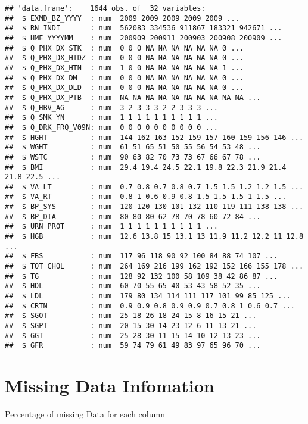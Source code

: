\documentclass{article}
\begin{document}
\begin{verbatim}
## 'data.frame':    1644 obs. of  32 variables:
##  $ EXMD_BZ_YYYY  : num  2009 2009 2009 2009 2009 ...
##  $ RN_INDI       : num  562083 334536 911867 183321 942671 ...
##  $ HME_YYYYMM    : num  200909 200911 200903 200908 200909 ...
##  $ Q_PHX_DX_STK  : num  0 0 0 NA NA NA NA NA NA 0 ...
##  $ Q_PHX_DX_HTDZ : num  0 0 0 NA NA NA NA NA NA 0 ...
##  $ Q_PHX_DX_HTN  : num  1 0 0 NA NA NA NA NA NA 1 ...
##  $ Q_PHX_DX_DM   : num  0 0 0 NA NA NA NA NA NA 0 ...
##  $ Q_PHX_DX_DLD  : num  0 0 0 NA NA NA NA NA NA 0 ...
##  $ Q_PHX_DX_PTB  : num  NA NA NA NA NA NA NA NA NA NA ...
##  $ Q_HBV_AG      : num  3 2 3 3 3 2 2 3 3 3 ...
##  $ Q_SMK_YN      : num  1 1 1 1 1 1 1 1 1 1 ...
##  $ Q_DRK_FRQ_V09N: num  0 0 0 0 0 0 0 0 0 0 ...
##  $ HGHT          : num  144 162 163 152 159 157 160 159 156 146 ...
##  $ WGHT          : num  61 51 65 51 50 55 56 54 53 48 ...
##  $ WSTC          : num  90 63 82 70 73 73 67 66 67 78 ...
##  $ BMI           : num  29.4 19.4 24.5 22.1 19.8 22.3 21.9 21.4 21.8 22.5 ...
##  $ VA_LT         : num  0.7 0.8 0.7 0.8 0.7 1.5 1.5 1.2 1.2 1.5 ...
##  $ VA_RT         : num  0.8 1 0.6 0.9 0.8 1.5 1.5 1.5 1 1.5 ...
##  $ BP_SYS        : num  120 120 130 101 132 110 119 111 138 138 ...
##  $ BP_DIA        : num  80 80 80 62 78 70 78 60 72 84 ...
##  $ URN_PROT      : num  1 1 1 1 1 1 1 1 1 1 ...
##  $ HGB           : num  12.6 13.8 15 13.1 13 11.9 11.2 12.2 11 12.8 ...
##  $ FBS           : num  117 96 118 90 92 100 84 88 74 107 ...
##  $ TOT_CHOL      : num  264 169 216 199 162 192 152 166 155 178 ...
##  $ TG            : num  128 92 132 100 58 109 38 42 86 87 ...
##  $ HDL           : num  60 70 55 65 40 53 43 58 52 35 ...
##  $ LDL           : num  179 80 134 114 111 117 101 99 85 125 ...
##  $ CRTN          : num  0.9 0.9 0.8 0.9 0.9 0.7 0.8 1 0.6 0.7 ...
##  $ SGOT          : num  25 18 26 18 24 15 8 16 15 21 ...
##  $ SGPT          : num  20 15 30 14 23 12 6 11 13 21 ...
##  $ GGT           : num  25 28 30 11 15 14 10 12 13 23 ...
##  $ GFR           : num  59 74 79 61 49 83 97 65 96 70 ...
\end{verbatim}

\newpage

\hypertarget{missing-data-infomation}{%
\section{Missing Data Infomation}\label{missing-data-infomation}}

Percentage of missing Data for each column
\end{document}
